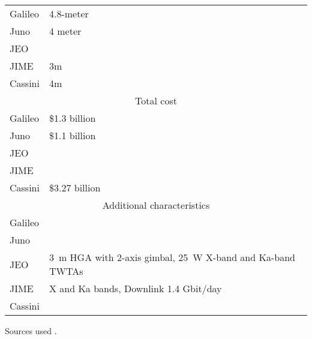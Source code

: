 \begin{longtable}{lp{}}
  Galileo & 4.8-meter \\

  Juno & 4 meter \\

  JEO & \\

  JIME & 3m \\

  Cassini & 4m \\

  \multicolumn{2}{c}{Total cost} \\ \midrule

  Galileo & \$1.3 billion \\

  Juno & \$1.1 billion \\

  JEO & \\

  JIME & \\

  Cassini & \$3.27 billion \\

  \multicolumn{2}{c}{Additional characteristics} \\ \midrule

  Galileo & \\

  Juno & \\

  JEO & \SI{3}{m} HGA with 2-axis gimbal, \SI{25}{W} X-band and
  Ka-band TWTAs \\

  JIME & X and Ka bands, Downlink 1.4 Gbit/day \\

  Cassini & \\ \bottomrule
\end{longtable}

Sources used
\cite{Galileo,Galileo2,Juno,JEO,Juice,Juice2,Cassini,Cassini2}.



